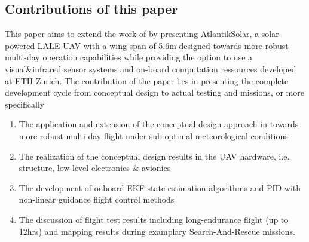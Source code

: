 \subsection{Contributions of this paper}
This paper aims to extend the work of \cite{Cocconi_SoLong,Noth_PhD} by presenting AtlantikSolar, a solar-powered LALE-UAV with a wing span of 5.6m designed towards more robust multi-day operation capabilities while providing the option to use a visual\&infrared sensor systems and on-board computation ressources developed at ETH Zurich. The contribution of the paper lies in presenting the complete development cycle from conceptual design to actual testing and missions, or more specifically
  
 \begin{enumerate}
\item The application and extension of the conceptual design approach in \cite{Noth_PhD,Leutenegger_JIRS} towards more robust multi-day flight under sub-optimal meteorological conditions
\item The realization of the conceptual design results in the UAV hardware, i.e. structure, low-level electronics \& avionics 
\item The development of onboard EKF state estimation algorithms and PID with non-linear guidance flight control methods
\item The discussion of flight test results including long-endurance flight (up to 12hrs) and mapping results during examplary Search-And-Rescue missions.
\end{enumerate}

